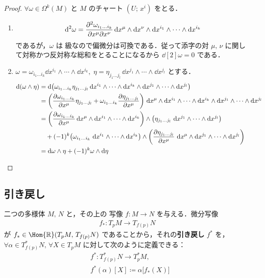 \documentclass[geometry_main]{subfiles}
\begin{document}
\begin{proof} 
	$\forall \omega \in \Omega^k(M)$ と $M$ のチャート $(U;\, x^i)$ をとる．
	\begin{enumerate} 
		\item \begin{align} 
			\dd[2]{\omega} = \pdv[2]{\omega_{i_1 \dots i_k}}{x^\mu}{x^\nu} \dd{x^\mu} \wedge \dd{x^\nu} \wedge \dd{x^{i_1}} \wedge \cdots \wedge \dd{x^{i_k}}
		\end{align}
		であるが，$\omega$ は \cinfty 級なので偏微分は可換である．従って添字の対 $\mu,\, \nu$ に関して対称かつ反対称な総和をとることになるから $\dd[2]{\omega} = 0$ である．
		\item $\omega = \omega_{i_1 \dots i_k} \dd{x^{i_1}} \wedge \cdots \wedge \dd{x^{i_k}},\; \eta = \eta_{j_1 \dots j_l}\, \dd{x^{j_1}} \wedge \cdots \wedge \dd{x^{j_l}}$ とする．
		\begin{align} 
			\dd{(\omega \wedge \eta)} &= \dd{\bigl( \omega_{i_1 \dots i_k}\eta_{j_1 \dots j_l} \dd{x^{i_1}} \wedge \cdots \wedge \dd{x^{i_k}} \wedge \dd{x^{j_1}} \wedge \cdots \wedge \dd{x^{j_l}} \bigr)}\\
			&=  \left( \pdv{\omega_{i_1 \dots i_k}}{x^\mu} \eta_{j_1 \dots j_l} + \omega_{i_1 \dots i_k} \pdv{\eta_{j_1 \dots j_l}}{x^\mu} \right)\, \dd{x^\mu} \wedge \dd{x^{i_1}} \wedge \cdots \wedge \dd{x^{i_k}} \wedge \dd{x^{j_1}} \wedge \cdots \wedge \dd{x^{j_l}} \\
			&= 	\left(\pdv{\omega_{i_1 \dots i_k}}{x^\mu} \dd{x^\mu} \wedge \dd{x^{i_1}} \wedge \cdots \wedge \dd{x^{i_k}} \right)  \wedge \bigl( \eta_{j_1 \dots j_l}\, \dd{x^{j_1}} \wedge \cdots \wedge \dd{x^{j_l}} \bigr) \\
			&\quad + (-1)^k \bigl( \omega_{i_1 \dots i_k} \, \dd{x^{i_1}} \wedge \cdots \wedge \dd{x^{i_k}} \bigr) \wedge \left( \pdv{\eta_{j_1 \dots j_l}}{x^\mu}\, \dd{x^\mu} \wedge \dd{x^{j_1}} \wedge \cdots \wedge \dd{x^{j_l}} \right) \\
			&= \dd{\omega} \wedge \eta + (-1)^k \omega \wedge \dd{\eta}
		\end{align}
	\end{enumerate}
\end{proof}

\subsection{引き戻し}

二つの\cinfty 多様体 $M,\, N$ と，その上の \cinfty 写像 $f \colon M \to N$ を与える．微分写像
\begin{align} 
	f_* \colon T_p M \to T_{f(p)}N
\end{align}
が $f_* \in \Hom{\mathbb{R}} ( T_p M,\,  T_{f(p)}N)$ であることから，それの\textbf{引き戻し} $f^*$ を，$\forall \alpha \in T_{f(p)}^* N,\, \forall X \in T_p M$ に対して次のように定義できる：
\begin{align} 
	&f^* \colon T_{f(p)}^* N \to T_{p}^*M, \\
	&f^*(\alpha)[X] \coloneqq \alpha\bigl[f_*(X)\bigr]
\end{align}
\end{document}
